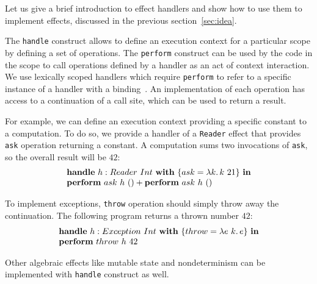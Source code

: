 \documentclass[acmsmall]{acmart}
\newcommand{\ap}{~}
\newcommand{\keyword}[1]{\mathbf{#1}}
\begin{document}
Let us give a brief introduction to effect handlers and show how to use them to implement effects, discussed in the previous section~\ref{sec:idea}.

The \texttt{handle} construct allows to define an execution context for a particular scope by defining a set of operations.
The \texttt{perform} construct can be used by the code in the scope to call operations defined by a handler as an act of context interaction.
We use lexically scoped handlers which require \texttt{perform} to refer to a specific instance of a handler with a binding~\cite{biernacki2019binders, brachthauser2020effects}.
An implementation of each operation has access to a continuation of a call site, which can be used to return a result.

For example, we can define an execution context providing a specific constant to a computation.
To do so, we provide a handler of a \texttt{Reader} effect that provides \texttt{ask} operation returning a constant.
A computation sums two invocations of \texttt{ask}, so the overall result will be $42$:
\[
    \begin{array}{l}
        \keyword{handle} ~ h : Reader\ap Int ~\keyword{with}~ \{ ask = \lambda k\ldotp k\ap 21 \} ~\keyword{in} \\
        \keyword{perform}~ask~h~() + \keyword{perform}~ask~h~()
    \end{array}
\]

To implement exceptions, \texttt{throw} operation should simply throw away the continuation.
The following program returns a thrown number $42$:
\[
    \begin{array}{l}
        \keyword{handle}~ h : Exception\ap Int ~\keyword{with}~ \{throw = \lambda e~k\ldotp e \} ~\keyword{in} \\
        \keyword{perform}~throw~h~42
    \end{array}
\]

Other algebraic effects like mutable state and nondeterminism can be implemented with \texttt{handle} construct as well. %

\end{document}
